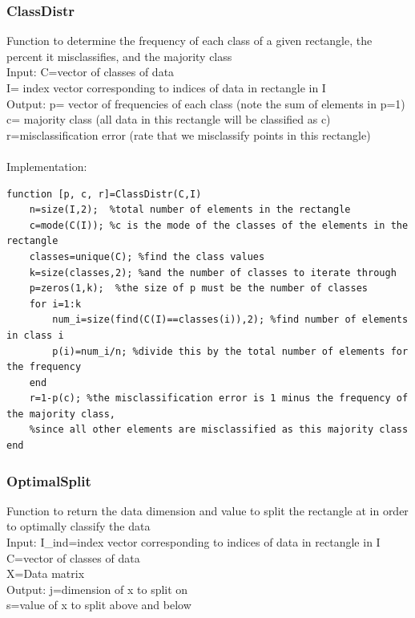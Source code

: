 \documentclass{article}
\begin{document}
\subsubsection*{ClassDistr}
Function to determine the frequency of each class of a given rectangle, the percent it misclassifies, and the majority class\\
Input:  C=vector of classes of data\\
        I= index vector corresponding to indices of data in rectangle in I\\
Output: p= vector of frequencies of each class (note the sum of elements in p=1)\\
        c= majority class (all data in this rectangle will be classified as c)\\
        r=misclassification error (rate that we misclassify points in this rectangle)\\
\\
Implementation:
\begin{verbatim}
function [p, c, r]=ClassDistr(C,I)
    n=size(I,2);  %total number of elements in the rectangle
    c=mode(C(I)); %c is the mode of the classes of the elements in the rectangle
    classes=unique(C); %find the class values
    k=size(classes,2); %and the number of classes to iterate through
    p=zeros(1,k);  %the size of p must be the number of classes
    for i=1:k
        num_i=size(find(C(I)==classes(i)),2); %find number of elements in class i
        p(i)=num_i/n; %divide this by the total number of elements for the frequency
    end
    r=1-p(c); %the misclassification error is 1 minus the frequency of the majority class, 
    %since all other elements are misclassified as this majority class
end
\end{verbatim}
\subsubsection*{OptimalSplit}
Function to return the data dimension and value to split the rectangle at in order to optimally classify the data
\\Input:  I\_ind=index vector corresponding to indices of data in rectangle in I
        \\C=vector of classes of data
        \\X=Data matrix
\\Output: j=dimension of x to split on
        \\s=value of x to split above and below
\end{document}
